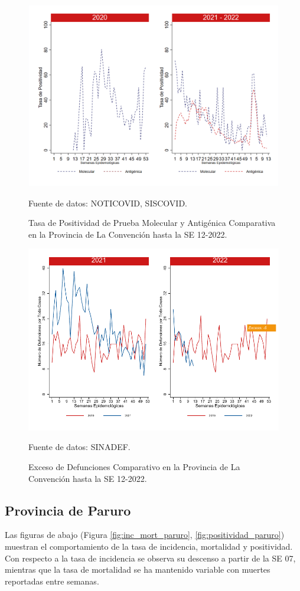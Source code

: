\documentclass[12pt,a4paper,openany]{book}
\begin{document}
		\begin{figure}[h]
			\caption{Tasa de Positividad de Prueba Molecular y Antigénica Comparativa en la Provincia de La Convención hasta la SE 12-2022.}\label{fig:positividad_laconv}
			\begin{center}
				\includegraphics[width=0.7\linewidth]{../figuras/positividad_20_21_9.png}
			\end{center}
			{\footnotesize {Fuente de datos: NOTICOVID, SISCOVID.}}
		\end{figure}
		
		\begin{figure}[h]
			\caption{Exceso de Defunciones Comparativo en la Provincia de La Convención hasta la SE 12-2022.}\label{fig:exceso_laconv}
			\begin{center}
				\includegraphics[width=0.7\linewidth]{../figuras/exceso_9.pdf}
			\end{center}
			{\footnotesize {Fuente de datos: SINADEF.}}
		\end{figure}
		
		\clearpage
		
		\subsection*{Provincia de Paruro}
		\noindent Las figuras de abajo (Figura \ref{fig:inc_mort_paruro}, \ref{fig:positividad_paruro}) muestran el comportamiento de la tasa de incidencia, mortalidad y positividad. Con respecto a la tasa de incidencia se observa su descenso a partir de la SE 07, mientras que la tasa de mortalidad se ha mantenido variable con muertes reportadas entre semanas. 
	 
\end{document}
